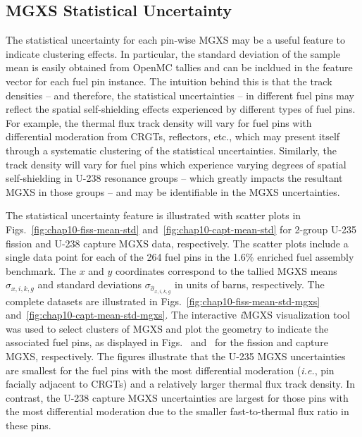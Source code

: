 

\subsection{MGXS Statistical Uncertainty}
\label{subsec:chap10-stat-uncertainty}

The statistical uncertainty for each pin-wise \ac{MGXS} may be a useful feature to indicate clustering effects. In particular, the standard deviation of the sample mean is easily obtained from OpenMC tallies and can be incldued in the feature vector for each fuel pin instance. The intuition behind this is that the track densities -- and therefore, the statistical uncertainties -- in different fuel pins may reflect the spatial self-shielding effects experienced by different types of fuel pins. For example, the thermal flux track density will vary for fuel pins with differential moderation from \acp{CRGT}, reflectors, etc., which may present itself through a systematic clustering of the statistical uncertainties. Similarly, the track density will vary for fuel pins which experience varying degrees of spatial self-shielding in U-238 resonance groups -- which greatly impacts the resultant \ac{MGXS} in those groups -- and may be identifiable in the \ac{MGXS} uncertainties.

The statistical uncertainty feature is illustrated with scatter plots in Figs.~\ref{fig:chap10-fiss-mean-std} and~\ref{fig:chap10-capt-mean-std} for 2-group U-235 fission and U-238 capture \ac{MGXS} data, respectively. The scatter plots include a single data point for each of the 264 fuel pins in the 1.6\% enriched fuel assembly benchmark. The $x$ and $y$ coordinates correspond to the tallied \ac{MGXS} means $\hat{\sigma}_{x,i,k,g}$ and standard deviations $\sigma_{\hat{\sigma}_{x,i,k,g}}$ in units of barns, respectively. The complete datasets are illustrated in Figs.~\ref{fig:chap10-fiss-mean-std-mgxs} and~\ref{fig:chap10-capt-mean-std-mgxs}. The interactive \textit{i}\ac{MGXS} visualization tool was used to select clusters of \ac{MGXS} and plot the geometry to indicate the associated fuel pins, as displayed in Figs.~ and~ for the fission and capture \ac{MGXS}, respectively. The figures illustrate that the U-235 \ac{MGXS} uncertainties are smallest for the fuel pins with the most differential moderation (\textit{i.e.}, pin facially adjacent to \acp{CRGT}) and a relatively larger thermal flux track density. In contrast, the U-238 capture \ac{MGXS} uncertainties are largest for those pins with the most differential moderation due to the smaller fast-to-thermal flux ratio in these pins.

